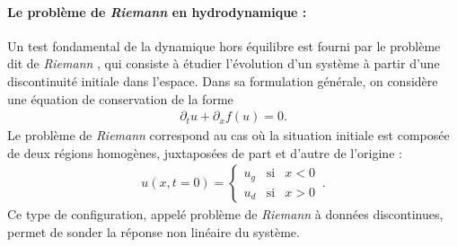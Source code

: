 \paragraph*{Le problème de \emph{Riemann} en hydrodynamique :}
Un test fondamental de la dynamique hors équilibre est fourni par le problème dit de \emph{Riemann} \cite{Riemann1860,Bressan2013}, qui consiste à étudier l’évolution d’un système à partir d'une discontinuité initiale dans l'espace. Dans sa formulation générale, on considère une équation de conservation de la forme
\begin{eqnarray}\label{chap6:eq.Rieman.1}
\partial_t u + \partial_x f(u) = 0.
\end{eqnarray}
Le problème de \emph{Riemann} correspond au cas où la situation initiale est composée de deux régions homogènes, juxtaposées de part et d’autre de l’origine :
\begin{eqnarray}\label{chap6:eq.Rieman.cond.1}
	u( x, t=0 ) = \left \{\begin{array}{rcl} u_g & \text{si} & x<0 \\ u_d & \text{si} & x > 0 \end{array} \right. \,.
\end{eqnarray}
Ce type de configuration, appelé problème de \emph{Riemann} à données discontinues, permet de sonder la réponse non linéaire du système.



